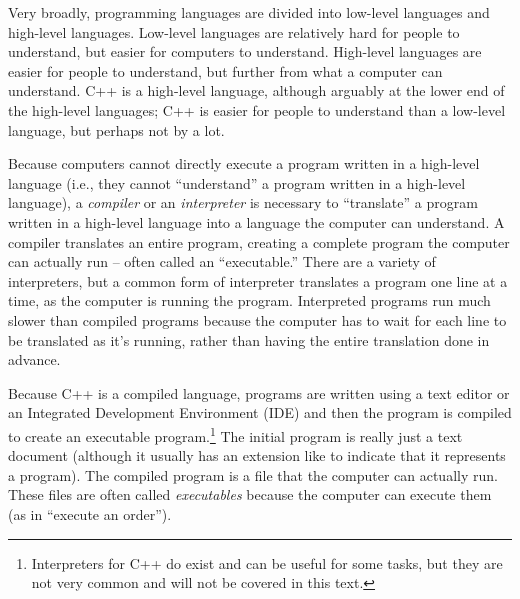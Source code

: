 Very broadly, programming languages are divided into low-level languages and high-level languages.  Low-level languages are relatively hard for people to understand, but easier for computers to understand.  High-level languages are easier for people to understand, but further from what a computer can understand.  C++ is a high-level language, although arguably at the lower end of the high-level languages; C++ is easier for people to understand than a low-level language, but perhaps not by a lot.

Because computers cannot directly execute a program written in a high-level language (i.e., they cannot ``understand'' a program written in a high-level language), a \emph{compiler}  or an \emph{interpreter} is necessary to ``translate'' a program written in a high-level language into a language the computer can understand.  A compiler translates an entire program, creating a complete program the computer can actually run -- often called an ``executable.''  There are a variety of interpreters, but a common form of interpreter translates a program one line at a time, as the computer is running the program.  Interpreted programs run much slower than compiled programs because the computer has to wait for each line to be translated as it's running, rather than having the entire translation done in advance.  

Because C++ is a compiled language, programs are written using a text editor or an Integrated Development Environment (IDE) and then the program is compiled to create an executable program.\footnote{Interpreters for C++ do exist and can be useful for some tasks, but they are not very common and will not be covered in this text.}  The initial program is really just a text document (although it usually has an extension like  to indicate that it represents a program).  The compiled program is a file that the computer can actually run.  These files are often called \emph{executables} because the computer can execute them (as in ``execute an order'').  


